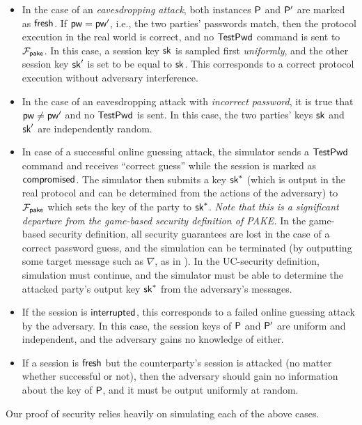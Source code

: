 	\begin{itemize}
		\item In the case of an \textit{eavesdropping attack}, both instances $\mathsf{P}$ and $\mathsf{P}'$ are marked as $\mathsf{fresh}$. If $\mathsf{pw} = \mathsf{pw}'$, i.e., the two parties' passwords match, then the protocol execution in the real world is correct, and no $\mathsf{TestPwd}$ command is sent to $\mathcal{F}_{\mathsf{pake}}$. In this case, a session key $\mathsf{sk}$ is sampled first \textit{uniformly}, and the other session key $\mathsf{sk}'$ is set to be equal to $\mathsf{sk}$. This corresponds to a correct protocol execution without adversary interference.
		\item In the case of an eavesdropping attack with \textit{incorrect password}, it is true that $\mathsf{pw}\neq\mathsf{pw}'$ and no $\mathsf{TestPwd}$ is sent. In this case, the two parties' keys $\mathsf{sk}$ and $\mathsf{sk}'$ are independently random.
		\item In case of a successful online guessing attack, the simulator sends a $\mathsf{TestPwd}$ command and receives ``correct guess'' while the session is marked as $\mathsf{compromised}$. The simulator then submits a key $\mathsf{sk}^{*}$ (which is output in the real protocol and can be determined from the actions of the adversary) to $\mathcal{F}_{\mathsf{pake}}$ which sets the key of the party to $\mathsf{sk}^{*}$. \textit{Note that this is a significant departure from the game-based security definition of PAKE.} In the game-based security definition, all security guarantees are lost in the case of a correct password guess, and the simulation can be terminated (by outputting some target message such as $\nabla$, as in \cite{EC:KatOstYun01}). In the UC-security definition, simulation must continue, and the simulator must be able to determine the attacked party's output key $\mathsf{sk}^{*}$ from the adversary's messages.
		\item If the session is $\mathsf{interrupted}$, this corresponds to a failed online guessing attack by the adversary. In this case, the session keys of $\mathsf{P}$ and $\mathsf{P}'$ are uniform and independent, and the adversary gains no knowledge of either.
		\item If a session is $\mathsf{fresh}$ but the counterparty's session is attacked (no matter whether successful or not), then the adversary should gain no information about the key of $\mathsf{P}$, and it must be output uniformly at random.
	\end{itemize}
	
	Our proof of security relies heavily on simulating each of the above cases.
	
	
	
%			
